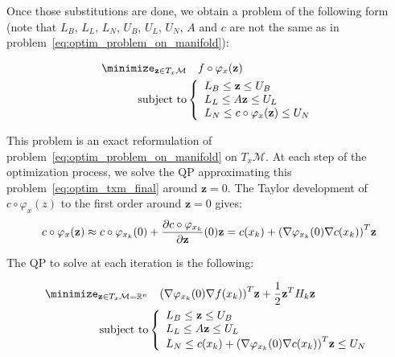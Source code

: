 Once those substitutions are done, we obtain a problem of the following form (note that $L_B$, $L_L$, $L_N$, $U_B$, $U_L$, $U_N$, $A$ and $c$ are not the same as in problem~\ref{eq:optim_problem_on_manifold}):

\begin{align}
\label{eq:optim_txm_final}
  \minimize_{\mathbf{z} \in T_x\mathcal{M}} & \quad f \circ \varphi_x(\mathbf{z})\\ \nonumber
  \text{subject to}&\left\{
  \begin{array}{lr}
    L_B \leq \mathbf{z} \leq U_B \\
    L_L \leq A \mathbf{z} \leq U_L \\
    L_N \leq c \circ \varphi_x(\mathbf{z}) \leq U_N
  \end{array}\right.
\end{align}

This problem is an exact reformulation of problem~\ref{eq:optim_problem_on_manifold} on $T_x\mathcal{M}$.
At each step of the optimization process, we solve the QP approximating this problem~\ref{eq:optim_txm_final} around $\mathbf{z}=0$.
The Taylor development of $c\circ\varphi_x(z)$ to the first order around $\mathbf{z} = 0$ gives:
\begin{equation}
  c \circ \varphi_x(\mathbf{z}) \approx c\circ \varphi_{x_k}(0) + \frac{\partial c\circ \varphi_{x_k}}{\partial {\bf z}}(0) {\bf z } = c(x_k) + {\left(\nabla\varphi_{x_k}(0) \nabla c (x_k)\right)}^T\mathbf{z}
\end{equation}

The QP to solve at each iteration is the following:

\begin{align}
  \label{eq:QP_txm}
  \begin{split}
  \minimize_{\mathbf{z} \in T_x\mathcal{M}=\mathbb{R}^n } & \quad {\left(\nabla\varphi_{x_k}(0) \nabla f (x_k)\right)}^T\mathbf{z} + \frac{1}{2} {\bf z }^T H_k{\bf z }\\
  \text{subject to}&\left\{
  \begin{array}{lr}
    L_B \leq \mathbf{z} \leq U_B \\
    L_L \leq A \mathbf{z} \leq U_L \\
    L_N \leq c(x_k) + {\left(\nabla\varphi_{x_k}(0) \nabla c (x_k)\right)}^T\mathbf{z}\leq U_N\\
  \end{array}\right.
  \end{split}
\end{align}

